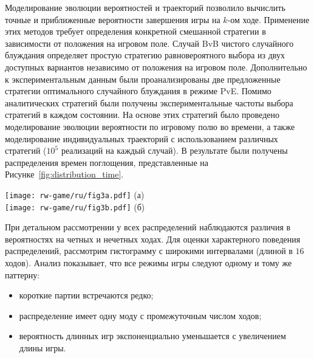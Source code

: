 Моделирование эволюции вероятностей и траекторий позволило вычислить точные и приближенные вероятности завершения игры на $k$-ом ходе. Применение этих методов требует определения конкретной смешанной стратегии в зависимости от положения на игровом поле. Случай BvB чистого случайного блуждания определяет простую стратегию равновероятного выбора из двух доступных вариантов независимо от положения на игровом поле. Дополнительно к экспериментальным данным были проанализированы две предложенные стратегии оптимального случайного блуждания в режиме PvE. Помимо аналитических стратегий были получены экспериментальные частоты выбора стратегий в каждом состоянии. На основе этих стратегий было проведено моделирование эволюции вероятности по игровому полю во времени, а также моделирование индивидуальных траекторий с использованием различных стратегий ($10^5$ реализаций на каждый случай). В результате были получены распределения времен поглощения, представленные на Рисунке~\cref{fig:distribution_time}.

\begin{figure*}[t]
    \centering
    \texttt{[image: rw-game/ru/fig3a.pdf]} (а) \\
    \texttt{[image: rw-game/ru/fig3b.pdf]} (б) \\
    \caption{
        Распределения длительностей игры, полученные моделированием (пунктирная линия), экспериментально полученные гистограммы числа ходов (закрашенная область), распределение длительностей при случайном блуждании (фиолетовая линия) и при применении оптимальных стратегий (непрерывная линия). Кривые представлены для двух случаев игры против стратегии случайного равновероятного выбора: (а) зеленые -- PvE при игре за центр и (б) синие -- PvE при игре за границу
    }  
    \label{fig:distribution_time}
    
\end{figure*}

При детальном рассмотрении у всех распределений наблюдаются различия в вероятностях на четных и нечетных ходах. Для оценки характерного поведения распределений, рассмотрим гистограмму с широкими интервалами (длиной в $16$ ходов). Анализ показывает, что все режимы игры следуют одному и тому же паттерну:
\begin{itemize}
\item короткие партии встречаются редко;
\item распределение имеет одну моду с промежуточным числом ходов;
\item вероятность длинных игр экспоненциально уменьшается с увеличением длины игры.
\end{itemize}

